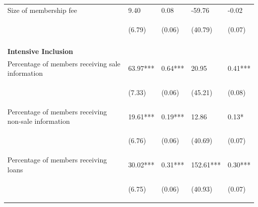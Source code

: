 \documentclass[11pt]{article}
\begin{document}
\begin{table}[H]
{\begin{tabularx}{1.5\linewidth}{lllll}
\noalign{\smallskip}Size of membership fee & 9.40 & 0.08 & -59.76 & -0.02\\
 & \begin{footnotesize}(6.79)\end{footnotesize} & \begin{footnotesize}(0.06)\end{footnotesize} & \begin{footnotesize}(40.79)\end{footnotesize} & \begin{footnotesize}(0.07)\end{footnotesize}\\ \\

\textbf{Intensive Inclusion} & & & & \\
\noalign{\smallskip}Percentage of members receiving sale information & 63.97*** & 0.64*** & 20.95 & 0.41***\\
 & \begin{footnotesize}(7.33)\end{footnotesize} & \begin{footnotesize}(0.06)\end{footnotesize} & \begin{footnotesize}(45.21)\end{footnotesize} & \begin{footnotesize}(0.08)\end{footnotesize}\\
\noalign{\smallskip}Percentage of members receiving non-sale information & 19.61*** & 0.19*** & 12.86 & 0.13*\\
 & \begin{footnotesize}(6.76)\end{footnotesize} & \begin{footnotesize}(0.06)\end{footnotesize} & \begin{footnotesize}(40.69)\end{footnotesize} & \begin{footnotesize}(0.07)\end{footnotesize}\\
\noalign{\smallskip}Percentage of members receiving loans & 30.02*** & 0.31*** & 152.61*** & 0.30***\\
 & \begin{footnotesize}(6.75)\end{footnotesize} & \begin{footnotesize}(0.06)\end{footnotesize} & \begin{footnotesize}(40.93)\end{footnotesize} & \begin{footnotesize}(0.07)\end{footnotesize}\\

\end{tabularx}}
\end{table}
\end{document}
